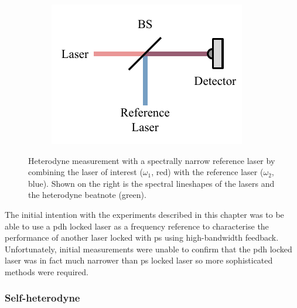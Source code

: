 \begin{figure}
    \begin{subfigure}{0.49\linewidth}
    \includegraphics{part1/Figs/HeterodyneReferenceLaser.pdf}
    \end{subfigure}
    \begin{subfigure}{0.49\linewidth}
    
    \end{subfigure}
    \caption[Heterodyne measurement with a spectrally narrow reference laser.]{Heterodyne measurement with a spectrally narrow reference laser by combining the laser of interest ($\omega_1$, red) with the reference laser ($\omega_2$, blue). Shown on the right is the spectral lineshapes of the lasers and the heterodyne beatnote (green).}
    \label{figure:heterodyne_reference}
\end{figure}

The initial intention with the experiments described in this chapter was to be able to use a \gls{pdh} locked laser as a frequency reference to characterise the performance of another laser locked with \gls{ps} using high-bandwidth feedback.
Unfortunately, initial measurements were unable to confirm that the \gls{pdh} locked laser was in fact much narrower than \gls{ps} locked laser so more sophisticated methods were required.

\subsubsection{Self-heterodyne}


